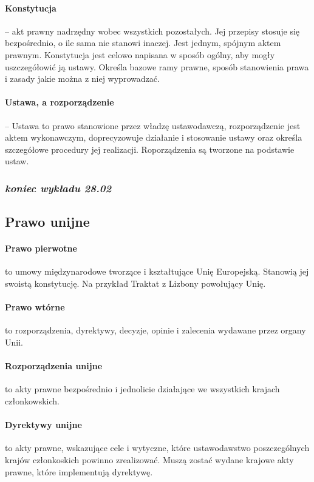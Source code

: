 \documentclass{article}
\begin{document}
\paragraph{Konstytucja}-- akt prawny nadrzędny wobec wszystkich pozostałych.
Jej przepisy stosuje się bezpośrednio, o ile sama nie stanowi inaczej.
Jest jednym, spójnym aktem prawnym. Konstytucja jest celowo napisana w sposób ogólny, aby mogły
uszczegółowić ją ustawy.
Określa bazowe ramy prawne, sposób stanowienia prawa i zasady jakie można z niej wyprowadzać.

\paragraph{Ustawa, a rozporządzenie} -- Ustawa to prawo stanowione przez władzę ustawodawczą,
rozporządzenie jest aktem wykonawczym, doprecyzowuje działanie i stosowanie ustawy oraz określa
szczegółowe procedury jej realizacji. Roporządzenia są tworzone na podstawie ustaw.

\subsubsection*{\textit{koniec wykładu 28.02}}

\subsection{Prawo unijne}

\paragraph{Prawo pierwotne}
to umowy międzynarodowe tworzące i kształtujące Unię Europejską. Stanowią jej swoistą konstytucję.
Na przykład Traktat z Lizbony powołujący Unię.

\paragraph{Prawo wtórne}
to rozporządzenia, dyrektywy, decyzje, opinie i zalecenia wydawane przez organy Unii.

\paragraph{Rozporządzenia unijne} to akty prawne
bezpośrednio i jednolicie działające we wszystkich krajach członkowskich.

\paragraph{Dyrektywy unijne} to akty prawne,
wskazujące cele i wytyczne, które ustawodawstwo poszczególnych krajów członkoskich powinno zrealizować.
Muszą zostać wydane krajowe akty prawne, które implementują dyrektywę.
\end{document}
